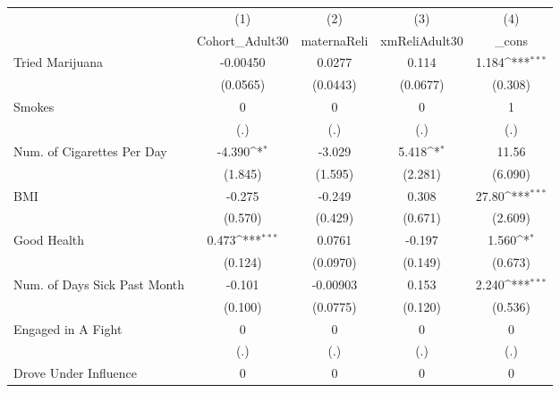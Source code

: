{
\def\sym#1{\ifmmode^{#1}\else\(^{#1}\)\fi}
\begin{tabular}{l*{4}{c}}
\hline\hline
            &\multicolumn{1}{c}{(1)}&\multicolumn{1}{c}{(2)}&\multicolumn{1}{c}{(3)}&\multicolumn{1}{c}{(4)}\\
            &\multicolumn{1}{c}{Cohort\_Adult30}&\multicolumn{1}{c}{maternaReli}&\multicolumn{1}{c}{xmReliAdult30}&\multicolumn{1}{c}{\_cons}\\
\hline
Tried Marijuana&    -0.00450         &      0.0277         &       0.114         &       1.184\sym{***}\\
            &    (0.0565)         &    (0.0443)         &    (0.0677)         &     (0.308)         \\
[1em]
Smokes      &           0         &           0         &           0         &           1         \\
            &         (.)         &         (.)         &         (.)         &         (.)         \\
[1em]
Num. of Cigarettes Per Day&      -4.390\sym{*}  &      -3.029         &       5.418\sym{*}  &       11.56         \\
            &     (1.845)         &     (1.595)         &     (2.281)         &     (6.090)         \\
[1em]
BMI         &      -0.275         &      -0.249         &       0.308         &       27.80\sym{***}\\
            &     (0.570)         &     (0.429)         &     (0.671)         &     (2.609)         \\
[1em]
Good Health &       0.473\sym{***}&      0.0761         &      -0.197         &       1.560\sym{*}  \\
            &     (0.124)         &    (0.0970)         &     (0.149)         &     (0.673)         \\
[1em]
Num. of Days Sick Past Month&      -0.101         &    -0.00903         &       0.153         &       2.240\sym{***}\\
            &     (0.100)         &    (0.0775)         &     (0.120)         &     (0.536)         \\
[1em]
Engaged in A Fight&           0         &           0         &           0         &           0         \\
            &         (.)         &         (.)         &         (.)         &         (.)         \\
[1em]
Drove Under Influence&           0         &           0         &           0         &           0         \\

\end{tabular}}
